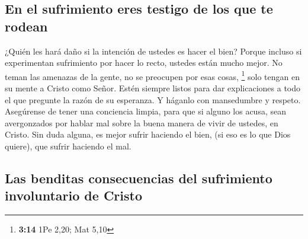 \hypertarget{en-el-sufrimiento-eres-testigo-de-los-que-te-rodean}{%
\subsection{En el sufrimiento eres testigo de los que te
rodean}\label{en-el-sufrimiento-eres-testigo-de-los-que-te-rodean}}

 ¿Quién les hará daño si la intención de ustedes es hacer
el bien?  Porque incluso si experimentan sufrimiento por
hacer lo recto, ustedes están mucho mejor. No teman las amenazas de la
gente, no se preocupen por esas cosas, \footnote{\textbf{3:14} 1Pe 2,20;
  Mat 5,10}  solo tengan en su mente a Cristo como Señor.
Estén siempre listos para dar explicaciones a todo el que pregunte la
razón de su esperanza. Y háganlo con mansedumbre y respeto.
 Asegúrense de tener una conciencia limpia, para que si
alguno los acusa, sean avergonzados por hablar mal sobre la buena manera
de vivir de ustedes, en Cristo.  Sin duda alguna, es
mejor sufrir haciendo el bien, (si eso es lo que Dios quiere), que
sufrir haciendo el mal.

\hypertarget{las-benditas-consecuencias-del-sufrimiento-involuntario-de-cristo}{%
\subsection{Las benditas consecuencias del sufrimiento involuntario de
Cristo}\label{las-benditas-consecuencias-del-sufrimiento-involuntario-de-cristo}}

